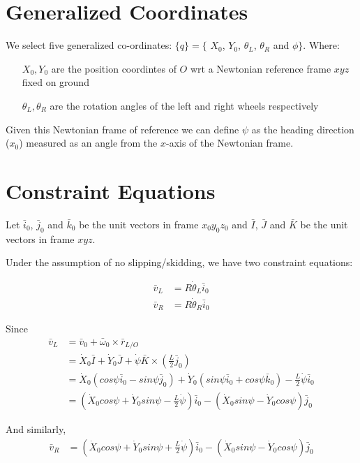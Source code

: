 \documentclass[a4paper,10pt]{article}
\begin{document}
\section{Generalized Coordinates}

We select five generalized co-ordinates: $\{q\} = \{$ $X_0$, $Y_0$, $\theta_L$, $\theta_R$ and $\phi \}$. Where:
\begin{itemize}[label={}]
 \item[$X_0, Y_0$] are the position coordintes of $O$ wrt a Newtonian reference frame $xyz$ fixed on ground
 \item[$\theta_L, \theta_R$] are the rotation angles of the left and right wheels respectively
\end{itemize}

Given this Newtonian frame of reference we can define $\psi$ as the heading direction ($x_0$) measured as
an angle from the $x$-axis of the Newtonian frame.

\section{Constraint Equations}
Let $\bar{i}_0$, $\bar{j}_0$ and $\bar{k}_0$ be the unit vectors in frame $x_0y_0z_0$ and $\bar{I}$, $\bar{J}$ and 
$\bar{K}$ be the unit vectors in frame $xyz$.

Under the assumption of no slipping/skidding, we have two constraint equations:

\begin{align} 
 \bar{v}_L &= R\dot\theta_L\bar{i}_0 \label{constraintOne}\\
 \bar{v}_R &= R\dot\theta_R\bar{i}_0 \label{constraintTwo}
\end{align}

Since
\begin{align}
 \bar{v}_L &= \bar{v}_0 + \bar\omega_0 \times \bar{r}_{L/O} \nonumber \\
 &= \dot{X}_0 \bar{I} + \dot{Y}_0 \bar{J} + \dot{\psi} \bar{K} \times (\frac{L}{2}\bar{j}_0) \nonumber \\
 &= \dot{X}_0 (cos\psi\bar{i}_0 - sin\psi\bar{j}_0) + \dot{Y}_0 (sin\psi\bar{i}_0+cos\psi\bar{k}_0) - \frac{L}{2}\dot{\psi} \bar{i}_0 \nonumber \\
 &= (\dot{X}_0 cos\psi + \dot{Y}_0 sin\psi - \frac{L}{2}\dot{\psi}) \bar{i}_0 - (\dot{X}_0 sin\psi - \dot{Y}_0 cos\psi)\bar{j}_0 \nonumber 
\end{align}

And similarly,
\begin{align}
 \bar{v}_R  &= (\dot{X}_0 cos\psi + \dot{Y}_0 sin\psi + \frac{L}{2}\dot{\psi}) \bar{i}_0 - (\dot{X}_0 sin\psi - \dot{Y}_0 cos\psi)\bar{j}_0 \nonumber 
\end{align}
\end{document}
